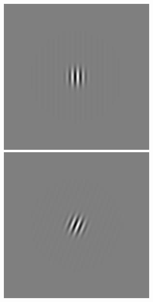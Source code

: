 \begin{figure}[ht]
\begin{center}
 \includegraphics[width=\columnwidth/9]{ch4/figures/iGabor2_0.jpg}
 \includegraphics[width=\columnwidth/9]{ch4/figures/iGabor2_1.jpg}

\end{center}
\end{figure}
